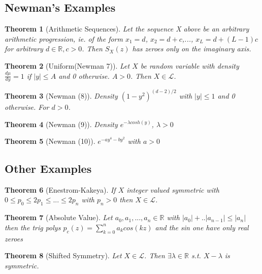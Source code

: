 \documentclass[10pt]{article}
\newcommand{\1}{\textbf{1}}
\newcommand{\R}{\mathbb{R}}
\newcommand{\lL}{\mathcal{L}}
\newtheorem{theorem}{Theorem}
\theoremstyle{remark}
\theoremstyle{definition}
\begin{document}
\subsection{Newman's Examples}

\begin{theorem}[Arithmetic Sequences] \label{them:AS}
	Let the sequence X above be an arbitrary arithmetic progression, ie. of the form $x_1 = d$, $x_2 = d+c$,..., $x_L = d + (L-1)c$ for arbitrary $d \in \R, c > 0$. Then $S_X(z)$ has zeroes only on the imaginary axis.
\end{theorem}

\begin{theorem}[Uniform(Newman 7)] \label{UNI}
	Let $X$ be random variable with density $\frac{d\mu}{dy} = 1$ if $|y| \leq A$ and 0 otherwise. $A > 0$. Then $X \in \lL$.
\end{theorem}

\begin{theorem}[Newman (8)] \label{N8}
	Density $(1-y^2)^{(d-2)/2}$ with $|y| \leq 1$ and 0 otherwise. For $d > 0$. 
\end{theorem}

\begin{theorem}[Newman (9)] \label{N9}
	Density $e^{-\lambda cosh(y)}$, $\lambda >0$
\end{theorem}

\begin{theorem}[Newman (10)] \label{N10}
	$e^{-ay^4-by^2}$ with $a>0$
\end{theorem}

\subsection{Other Examples}

\begin{theorem}[Enestrom-Kakeya] \label{them:EK}
	If $X$ integer valued symmetric with $0\leq p_0 \leq 2 p_1 \leq ... \leq 2p_n$ with $p_n >0$ then $X \in \lL$.
\end{theorem}

\begin{theorem}[Absolute Value] \label{them:ABS}
	Let $a_0,a_1,...,a_n \in \R$ with $|a_0| + .. | a_{n-1}| \leq |a_n|$ then the trig polys $p_c(z) = \sum_{k=0}^n a_k cos(kz)$ and the sin one have only real zeroes
\end{theorem}

\begin{theorem}[Shifted Symmetry] \label{SS}
	Let $X \in \lL$. Then $\exists \lambda \in \R$ s.t. $X - \lambda$ is symmetric.
\end{theorem}
\end{document}
